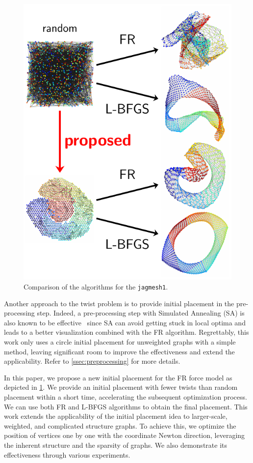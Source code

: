 \documentclass[dvipdfmx,10pt,journal,compsoc]{IEEEtran}
\begin{document}
\begin{figure}[t]
  \centering
  \includegraphics[width=0.8\columnwidth]{fig1/fig1.pdf}
  \caption{
    Comparison of the algorithms for the \texttt{jagmesh1}.
  }
  \label{fig:fig1}
\end{figure}

Another approach to the twist problem is to provide initial placement in the pre-processing step.
Indeed, a pre-processing step with Simulated Annealing (SA) is also known to be effective~\cite{ghassemitoosiSimulatedAnnealingPreProcessing2016} since SA can avoid getting stuck in local optima and leads to a better visualization combined with the FR algorithm.
Regrettably, this work only uses a circle initial placement for unweighted graphs with a simple method, leaving significant room to improve the effectiveness and extend the applicability. Refer to \cref{ssec:preprocessing} for more details.

In this paper, we propose a new initial placement for the FR force model as depicted in \cref{fig:fig1}.
We provide an initial placement with fewer twists than random placement within a short time, accelerating the subsequent optimization process. We can use both FR and L-BFGS algorithms to obtain the final placement.
This work extends the applicability of the initial placement idea to larger-scale, weighted, and complicated structure graphs.
To achieve this, we optimize the position of vertices one by one with the coordinate Newton direction, leveraging the inherent structure and the sparsity of graphs.
We also demonstrate its effectiveness through various experiments.
\end{document}

